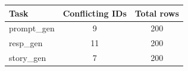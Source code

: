 \begin{tabular}{lcc}
\toprule
Task & Conflicting IDs & Total rows \\
\midrule
prompt\_gen & 9 & 200 \\
resp\_gen & 11 & 200 \\
story\_gen & 7 & 200 \\
\bottomrule
\end{tabular}
